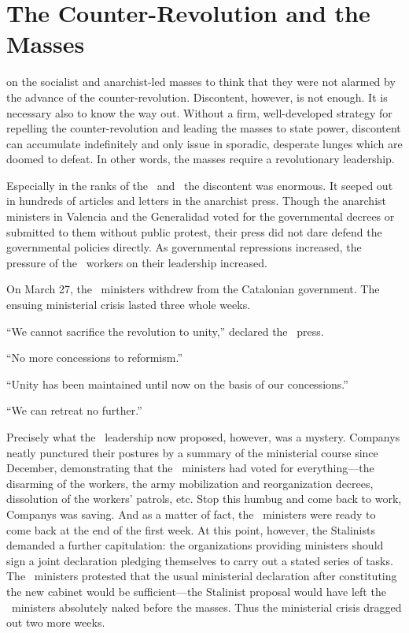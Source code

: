 \chapter{The Counter-Revolution and the Masses}

 on the socialist and anarchist-led masses to think that they were not alarmed by the advance of the counter-revolution. Discontent, however, is not enough. It is necessary also to know the way out. Without a firm, well-developed strategy for repelling the counter-revolution and leading the masses to state power, discontent can accumulate indefinitely and only issue in sporadic, desperate lunges which are doomed to defeat. In other words, the masses require a revolutionary leadership.

Especially in the ranks of the \CNT\ and \FAI\ the discontent was enormous. It seeped out in hundreds of articles and letters in the anarchist press. Though the anarchist ministers in Valencia and the Generalidad voted for the governmental decrees or submitted to them without public protest, their press did not dare defend the governmental policies directly. As governmental repressions increased, the pressure of the \CNT\ workers on their leadership increased.

On March 27, the \CNT\ ministers withdrew from the Catalonian government. The ensuing ministerial crisis lasted three whole weeks.

``We cannot sacrifice the revolution to unity,'' declared the \CNT\ press.

``No more concessions to reformism.''

``Unity has been maintained until now on the basis of our concessions.''

``We can retreat no further.''

Precisely what the \CNT\ leadership now proposed, however, was a mystery. Companys neatly punctured their postures by a summary of the ministerial course since December, demonstrating that the \CNT\ ministers had voted for everything---the disarming of the workers, the army mobilization and reorganization decrees, dissolution of the workers’ patrols, etc. Stop this humbug and come back to work, Companys was saving. And as a matter of fact, the \CNT\ ministers were ready to come back at the end of the first week. At this point, however, the Stalinists demanded a further capitulation: the organizations providing ministers should sign a joint declaration pledging themselves to carry out a stated series of tasks. The \CNT\ ministers protested that the usual ministerial declaration after constituting the new cabinet would be sufficient---the Stalinist proposal would have left the \CNT\ ministers absolutely naked before the masses. Thus the ministerial crisis dragged out two more weeks.


